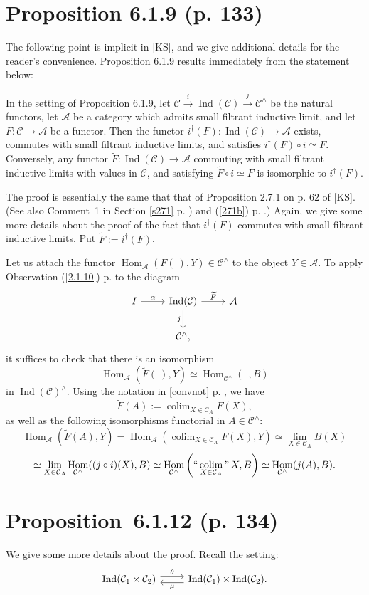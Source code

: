 \documentclass[12pt]{article}
\theoremstyle{remark}
\newcommand{\A}{\mathcal A}
\newcommand{\C}{\mathcal C}
\newcommand{\pr}{Proposition}
\DeclareMathOperator*{\coli}{colim}
\DeclareMathOperator*{\icolim}{``\coli"}
\DeclareMathOperator{\Hom}{Hom}
\DeclareMathOperator{\Ind}{Ind}
\begin{document}
\section{Proposition 6.1.9 (p. 133)}\label{619}%
%
The following point is implicit in [KS], and we give additional details for the reader's convenience. Proposition 6.1.9 results immediately from the statement below:

In the setting of Proposition 6.1.9, let $\C\overset{i}{\to}\Ind(\C)\overset{j}{\to}\C^\wedge$ be the natural functors, let $\A$ be a category which admits small filtrant inductive limit, and let $F:\C\to\A$ be a functor. Then the functor $i^\dagger(F):\Ind(\C)\to\A$ exists, commutes with small filtrant inductive limits, and satisfies $i^\dagger(F)\circ i\simeq F$. Conversely, any functor $\widetilde F:\Ind(\C)\to\A$ commuting with small filtrant inductive limits with values in $\C$, and satisfying $\widetilde F\circ i\simeq F$ is isomorphic to $i^\dagger(F)$. 

The proof is essentially the same that that of Proposition 2.7.1 on p. 62 of [KS]. (See also Comment~1 in Section \ref{s271} p. \pageref{s271}) and (\ref{271b}) p. \pageref{271b}.) Again, we give some more details about the proof of the fact that $i^\dagger(F)$ commutes with small filtrant inductive limits. Put $\widetilde F:=i^\dagger(F)$. 

Let us attach the functor $\Hom_\A(F(\ ),Y)\in\C^\wedge$ to the object $Y\in\A$. To apply Observation (\ref{2.1.10}) p. \pageref{2.1.10} to the diagram 
$$
\begin{tikzcd}
I\ar{r}{\alpha}&\Ind(\C)\ar{d}[swap]{j}\ar{r}{\widetilde F}&\A\\
&\C^\wedge,
\end{tikzcd}
$$
it suffices to check that there is an isomorphism 
$$
\Hom_\A\left(\widetilde F(\ ),Y\right)\simeq
\Hom_{\C^\wedge}(\ \ ,B)
$$ 
in $\Ind(\C)^\wedge$. Using the notation in \eqref{convnot} p. \pageref{convnot}, we have 
$$
\widetilde F(A):=\coli_{X\in\C_A}F(X),
$$ 
as well as the following isomorphisms functorial in $A\in\C^\wedge$:
$$
\Hom_\A\left(\widetilde F(A),Y\right)=
\Hom_\A\left(\coli_{X\in\C_A}F(X),Y\right)\simeq
\lim_{X\in\C_A}B(X)
$$
$$
\simeq
\lim_{X\in\C_A}\Hom_{\C^\wedge}((j\circ i)(X),B)
\simeq
\Hom_{\C^\wedge}\left(\icolim_{X\in\C_A}X,B\right)\simeq
\Hom_{\C^\wedge}(j(A),B).
$$ 
%
% 
\section{\pr\ 6.1.12 (p. 134)}%
%
We give some more details about the proof. Recall the setting: 
$$
\begin{tikzcd}
\Ind(\C_1\times\C_2)\ar[yshift=0.7ex]{r}{\theta}&\Ind(\C_1)\times\Ind(\C_2).\ar[yshift=-0.7ex]{l}{\mu}
\end{tikzcd}
$$ 
\end{document}
